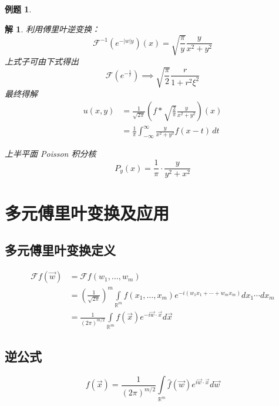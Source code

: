 \documentclass[12pt,a4paper]{article}
\numberwithin{subsection}{section}   %
\numberwithin{subsubsection}{subsection}
\theoremstyle{plain}
\newtheorem{solution}{解}[subsection]  %
\theoremstyle{definition}
\newtheorem{example}{例题}[subsection]  %
\theoremstyle{remark}
\theoremstyle{remark}
\begin{document}
\begin{example}
\begin{solution}
利用傅里叶逆变换：
\begin{equation}
	\mathcal{F}^{-1}\left(e^{-|w| y}\right)(x) = \sqrt{\dfrac{\pi}{y}} \dfrac{y}{x^2 + y^2}
\end{equation}
上式子可由下式得出
	\begin{equation}
	\mathcal{F}\left(e^{-\frac{1}{r}}\right) \implies \sqrt{\dfrac{\pi}{2}} \dfrac{r}{1 + r^2 \xi^2}
\end{equation}
	最终得解
\begin{equation}
	\begin{aligned}
		u(x, y) &= \frac{1}{\sqrt{2 \pi}}\left(f * \sqrt{\frac{2}{\pi}} \frac{y}{x^{2} + y^{2}}\right)(x) \\
		&= \frac{1}{\pi} \int_{-\infty}^{\infty} \frac{y}{x^{2} + y^{2}} f(x - t) \, dt
	\end{aligned}
\end{equation}
	
	上半平面 Poisson 积分核
	\begin{equation}
			P_y(x) = \dfrac{1}{\pi} \cdot \dfrac{y}{y^2 + x^2}
	\end{equation}
	
	\end{solution}
\end{example}

\section{多元傅里叶变换及应用}

\subsection{多元傅里叶变换定义}
\begin{equation}
	\begin{aligned}
		\mathcal{F}f(\vec{w}) &= \mathcal{F}f(w_1, \dots, w_m) \\
		&= \left(\frac{1}{\sqrt{2\pi}}\right)^m \int\limits_{\mathbb{R}^m} f(x_1, \dots, x_m) e^{-i(w_1x_1 + \cdots + w_mx_m)} dx_1 \cdots dx_m \\
		&= \frac{1}{(2\pi)^{m/2}} \int\limits_{\mathbb{R}^m} f(\vec{x}) e^{-i \vec{w} \cdot \vec{x}} d\vec{x}
	\end{aligned}
\end{equation}

\subsection{逆公式}
\begin{equation}
	f(\vec{x}) = \frac{1}{(2\pi)^{m/2}} \int\limits_{\mathbb{R}^m} \hat{f}(\vec{w}) e^{i \vec{w} \cdot \vec{x}} d\vec{w}
\end{equation}
\end{document}
